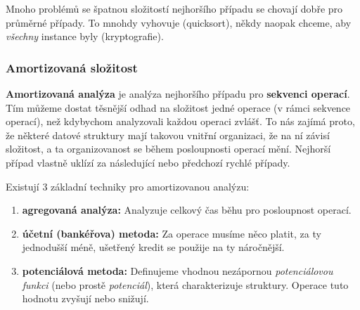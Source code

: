 \documentclass[11pt]{report} %
\numberwithin{equation}{section}
\begin{document}
Mnoho problémů se špatnou složitostí nejhoršího případu se chovají dobře pro průměrné případy. To mnohdy vyhovuje (quicksort), někdy naopak chceme, aby \textit{všechny} instance byly  (kryptografie).  


\subsubsection{Amortizovaná složitost}
\textbf{Amortizovaná analýza} je analýza nejhoršího případu pro \textbf{sekvenci operací}. Tím můžeme dostat těsnější odhad na složitost jedné operace (v rámci sekvence operací), než kdybychom analyzovali každou operaci zvlášť. To nás zajímá proto, že některé datové struktury mají takovou vnitřní organizaci, že na ní závisí složitost, a ta organizovanost se během posloupnosti operací mění. Nejhorší případ vlastně uklízí za následující nebo předchozí rychlé případy.

Existují 3 základní techniky pro amortizovanou analýzu:
\begin{enumerate}
	\item \textbf{agregovaná analýza:} Analyzuje celkový čas běhu pro posloupnost operací.
	\item \textbf{účetní (bankéřova) metoda:} Za operace musíme něco platit, za ty jednodušší méně, ušetřený kredit se použije na ty náročnější.
	\item \textbf{potenciálová metoda:} Definujeme vhodnou nezápornou \textit{potenciálovou funkci} (nebo prostě \textit{potenciál}), která charakterizuje  struktury. Operace tuto hodnotu zvyšují nebo snižují.
\end{enumerate}
\end{document}
